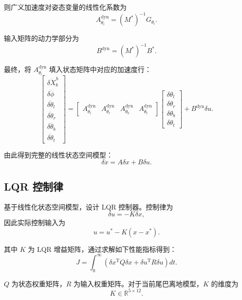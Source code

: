 \documentclass[UTF8,a4paper,12pt]{ctexart}
\begin{document}
则广义加速度对姿态变量的线性化系数为
\begin{equation}
    A_{\theta_i}^{\mathrm{dyn}}
    =
    \left(M^\ast\right)^{-1}
    G_{\theta_i}.
\end{equation}

输入矩阵的动力学部分为
\begin{equation}
    B^{\mathrm{dyn}}
    =
    \left(M^\ast\right)^{-1}
    B^\ast.
\end{equation}

最终，将 $A_{\theta_i}^{\mathrm{dyn}}$ 填入状态矩阵中对应的加速度行：
\begin{equation}
    \left[
    \begin{array}{c}
        \delta \ddot X_b^h \\
        \delta \ddot \phi \\
        \delta \ddot \theta_l \\
        \delta \ddot \theta_r \\
        \delta \ddot \theta_b \\
        \delta \ddot \theta_t
    \end{array}
    \right]
    =
    \begin{bmatrix}
        A_{\theta_l}^{\mathrm{dyn}} &
        A_{\theta_r}^{\mathrm{dyn}} &
        A_{\theta_b}^{\mathrm{dyn}} &
        A_{\theta_t}^{\mathrm{dyn}}
    \end{bmatrix}
    \begin{bmatrix}
        \delta\theta_l \\
        \delta\theta_r \\
        \delta\theta_b \\
        \delta\theta_t
    \end{bmatrix}
    +
    B^{\mathrm{dyn}}\delta u.
\end{equation}

由此得到完整的线性状态空间模型：
\begin{equation}
    \delta \dot x
    =
    A\delta x + B\delta u.
\end{equation}

\subsection{LQR 控制律}

基于线性化状态空间模型，设计 LQR 控制器。控制律为
\begin{equation}
    \delta u = -K\delta x,
\end{equation}
因此实际控制输入为
\begin{equation}
    u =
    u^\ast - K(x-x^\ast).
\end{equation}

其中 $K$ 为 LQR 增益矩阵，通过求解如下性能指标得到：
\begin{equation}
    J =
    \int_0^\infty
    \left(
        \delta x^{\mathrm T}Q\delta x
        +
        \delta u^{\mathrm T}R\delta u
    \right)
    dt.
\end{equation}

$Q$ 为状态权重矩阵，$R$ 为输入权重矩阵。对于当前尾巴离地模型，$K$ 的维度为
\begin{equation}
    K \in \mathbb{R}^{5\times 12}.
\end{equation}
\end{document}
